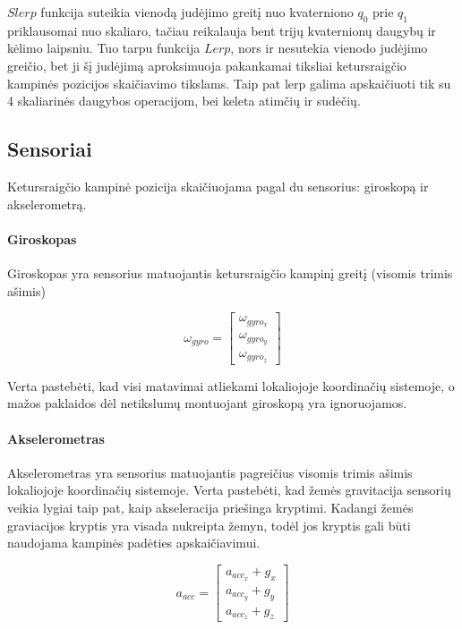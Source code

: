 \documentclass[12pt, a4paper, lithuanian, final]{article}
\begin{document}
$Slerp$ funkcija suteikia vienodą judėjimo greitį nuo kvaterniono $q_0$ prie $q_1$ priklausomai nuo skaliaro, tačiau reikalauja bent trijų kvaternionų daugybų ir kėlimo laipsniu.
Tuo tarpu funkcija $Lerp$, nors ir nesutekia vienodo judėjimo greičio, bet ji šį judėjimą aproksimuoja pakankamai tiksliai ketursraigčio kampinės pozicijos skaičiavimo tikslams.
Taip pat lerp galima apskaičiuoti tik su 4 skaliarinės daugybos operacijom, bei keleta atimčių ir sudėčių.








\subsection{Sensoriai}

Ketursraigčio kampinė pozicija skaičiuojama pagal du sensorius: giroskopą ir akselerometrą.

\paragraph{Giroskopas} Giroskopas yra sensorius matuojantis ketursraigčio kampinį greitį (visomis trimis ašimis)

\begin{equation}
	\omega_{gyro} = \left[
		\begin{array}{c}
			\omega_{gyro_x} \\
			\omega_{gyro_y} \\
			\omega_{gyro_z}
		\end{array}
	\right]
\end{equation}

Verta pastebėti, kad visi matavimai atliekami lokaliojoje koordinačių sistemoje, o mažos paklaidos dėl netikslumų montuojant giroskopą yra ignoruojamos.

\paragraph{Akselerometras} Akselerometras yra sensorius matuojantis pagreičius visomis trimis ašimis lokaliojoje koordinačių sistemoje.
Verta pastebėti, kad žemės gravitacija sensorių veikia lygiai taip pat, kaip akseleracija priešinga kryptimi.
Kadangi žemės graviacijos kryptis yra visada nukreipta žemyn, todėl jos kryptis gali būti naudojama kampinės padėties apskaičiavimui.

\begin{equation}
	a_{acc} = \left[
		\begin{array}{c}
			a_{acc_x} + g_x \\
			a_{acc_y} + g_y \\
			a_{acc_z} + g_z
		\end{array}
	\right]
\end{equation}
\end{document}
